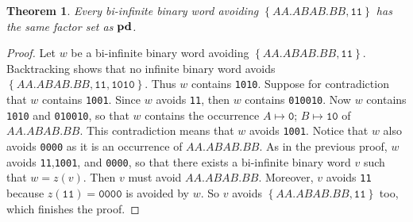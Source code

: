 \documentclass{article}
\def\acc#1{\left\{ #1 \right\}}
\renewcommand{\ge}{\geqslant}
\theoremstyle{plain}
\newtheorem{theorem}{Theorem}
\theoremstyle{definition}
\theoremstyle{remark}
\begin{document}
\begin{theorem}
Every bi-infinite binary word avoiding $\acc{AA.ABAB.BB,\texttt{11}}$ has the same factor set as ${\bf pd}$.
\end{theorem}
\begin{proof}
Let $w$ be a bi-infinite binary word avoiding $\acc{AA.ABAB.BB,\texttt{11}}$.
Backtracking shows that no infinite binary word avoids $\acc{AA.ABAB.BB,\texttt{11},\texttt{1010}}$.
Thus $w$ contains \texttt{1010}.
Suppose for contradiction that $w$ contains \texttt{1001}.
Since $w$ avoids \texttt{11}, then $w$ contains \texttt{010010}.
Now $w$ contains \texttt{1010} and \texttt{010010}, so that $w$ contains the occurrence $A\mapsto\texttt{0}$;
$B\mapsto\texttt{10}$ of $AA.ABAB.BB$.
This contradiction means that $w$ avoids \texttt{1001}.
Notice that $w$ also avoids \texttt{0000} as it is an occurrence of $AA.ABAB.BB$.
As in the previous proof, $w$ avoids \texttt{11},\texttt{1001}, and \texttt{0000},
so that there exists a bi-infinite binary word $v$ such that $w=z(v)$.
Then $v$ must avoid $AA.ABAB.BB$. Moreover, $v$ avoids \texttt{11} because
$z(\texttt{11})=\texttt{0000}$ is avoided by $w$.
So $v$ avoids  $\acc{AA.ABAB.BB,\texttt{11}}$ too, which finishes the proof.
\end{proof}



\end{document}
